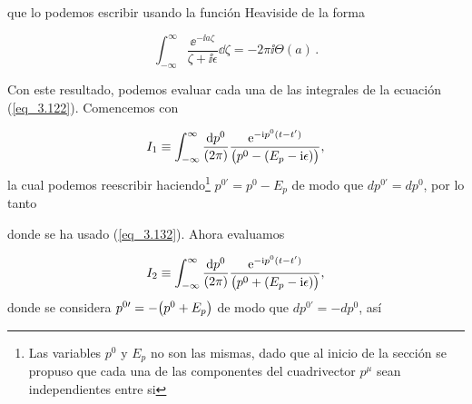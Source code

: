 que lo podemos escribir usando la función Heaviside de la forma

\begin{equation}
    \boxed{
    \int_{-\infty}^\infty  \frac{\ee^{-\ii a \zeta}}{\zeta+\ii \epsilon} \dd{\zeta}= - 2\pi \ii \Theta(a) } \, .
    \label{eq_3.132}
\end{equation}

Con este resultado, podemos evaluar cada una de las integrales de la ecuación (\ref{eq_3.122}). Comencemos con

\begin{equation*}
    I_1 \equiv \int_{-\infty}^\infty \frac{\dd{p^0}} {\qty(2\pi)} \frac{\mathrm{e}^{ -\mathrm{i} p^0(t-t^{\prime})}}{\qty\big(p^0-\qty(E_p - \mathrm{i} \epsilon))},
\end{equation*}
la cual podemos reescribir haciendo\footnote{Las variables $p^0$ y $E_p$ no son las mismas, dado que al inicio de la sección se propuso que cada una de las componentes del cuadrivector $p^\mu$ sean independientes entre si} $p^{0 \prime}=p^0-E_p$ de modo que $dp^{0 \prime}=dp^0$, por lo tanto

donde se ha usado (\ref{eq_3.132}). Ahora evaluamos

\begin{equation*}
    I_2 \equiv \int_{-\infty}^\infty \frac{\dd{p^0}} {\qty(2\pi)} \frac{\mathrm{e}^{ -\mathrm{i} p^0(t-t^{\prime})}}{\qty\big(p^0+\qty(E_p - \mathrm{i} \epsilon))},
\end{equation*}
donde se considera $p^{0 \prime}=-\qty(p^0+E_p)$ de modo que $dp^{0 \prime}=-dp^0$, así


